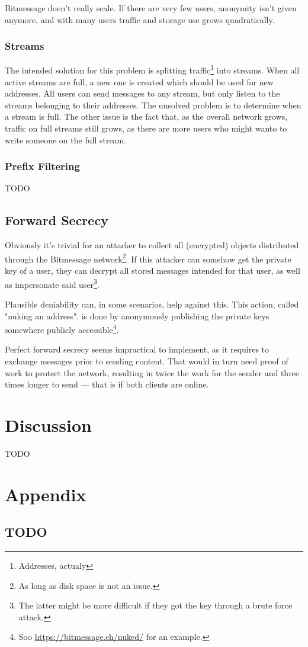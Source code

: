 \documentclass{bfh}
\begin{document}
  Bitmessage doen't really scale. If there are very few users, anonymity isn't given anymore, and with many users traffic and storage use grows quadratically.

  \subsubsection{Streams}
  The intended solution for this problem is splitting traffic\footnote{Addresses, actualy} into streams. When all active streams are full, a new one is created which should be used for new addresses. All users can send messages to any stream, but only listen to the streams belonging to their addresses. The unsolved problem is to determine when a stream is full. The other issue is the fact that, as the overall network grows, traffic on full streams still grows, as there are more users who might wanto to write someone on the full stream.

  \subsubsection{Prefix Filtering}
  TODO

  \subsection{Forward Secrecy}

  Obviously it's trivial for an attacker to collect all (encrypted) objects distributed through the Bitmessage network\footnote{As long as disk space is not an issue.}. If this attacker can somehow get the private key of a user, they can decrypt all stored messages intended for that user, as well as impersonate said user\footnote{The latter might be more difficult if they got the key through a brute force attack.}.

  Plausible deniability can, in some scenarios, help against this. This action, called "nuking an address", is done by anonymously publishing the private keys somewhere publicly accessible\footnote{Soo \url{https://bitmessage.ch/nuked/} for an example.}.

  Perfect forward secrecy seems impractical to implement, as it requires to exchange messages prior to sending content. That would in turn need proof of work to protect the network, resulting in twice the work for the sender and three times longer to send --- that is if both clients are online.

  \section{Discussion}

  TODO


  
  

  \appendix
  \section*{Appendix}
  \renewcommand{\thesubsection}{\Alph{subsection}}

  \subsection{TODO}
\end{document}
